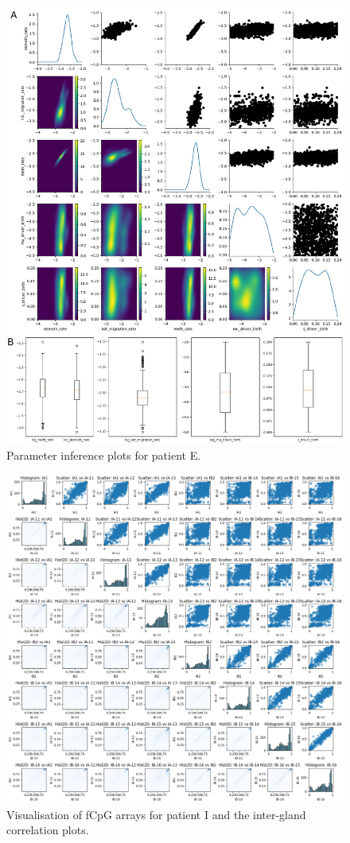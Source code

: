 \begin{figure}[ht]
\centering
\includegraphics[width=\textwidth]{Chapter_5/figures/inference_E.pdf}
\caption{Parameter inference plots for patient E.}
\label{fig:inference_E}
\end{figure}

\begin{figure}[ht]
\centering
\includegraphics[width=\textwidth]{Chapter_5/figures/fCpG_loci_I.png}
\caption{Visualisation of fCpG arrays for patient I and the inter-gland
    correlation plots.}
\label{fig:vis_I}
\end{figure}

